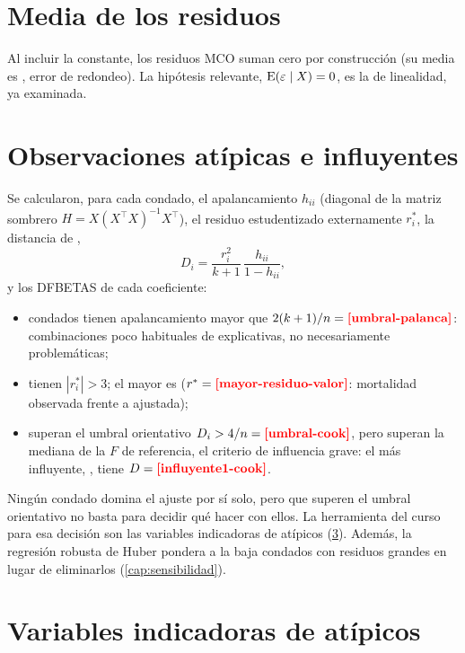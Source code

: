 \section{Media de los residuos}

Al incluir la constante, los residuos MCO suman cero por construcción (su media es
, error de redondeo). La hipótesis relevante,
$\operatorname{E}(\varepsilon\mid X)=0$, es la de linealidad, ya examinada.

\section{Observaciones atípicas e influyentes}\label{sec:influencia}

Se calcularon, para cada condado, el apalancamiento $h_{ii}$ (diagonal de la matriz sombrero
$H=X(X^{\top}X)^{-1}X^{\top}$), el residuo estudentizado externamente $r_i^{*}$, la distancia de
\textcite{cook1977},
\[
D_i=\frac{r_i^{2}}{k+1}\,\frac{h_{ii}}{1-h_{ii}},
\]
y los DFBETAS de cada coeficiente:
\begin{itemize}
  \item {} condados tienen apalancamiento mayor que $2(k+1)/n=\res{umbral-palanca}$:
  combinaciones poco habituales de explicativas, no necesariamente problemáticas;
  \item {} tienen $|r_i^{*}|>3$; el mayor es 
  ($r^{*}=\res{mayor-residuo-valor}$: mortalidad observada  frente a
   ajustada);
  \item {} superan el umbral orientativo $D_i>4/n=\res{umbral-cook}$, pero
   superan la mediana de la $F$ de referencia, el criterio de influencia grave: el
  más influyente, , tiene $D=\res{influyente1-cook}$.
\end{itemize}



Ningún condado domina el ajuste por sí solo, pero que  superen el umbral orientativo
no basta para decidir qué hacer con ellos. La herramienta del curso para esa decisión son las
variables indicadoras de atípicos (\cref{sec:indicadoras}). Además, la regresión robusta de Huber
pondera a la baja  condados con residuos grandes en lugar de eliminarlos
(\cref{cap:sensibilidad}).

\section{Variables indicadoras de atípicos}\label{sec:indicadoras}

